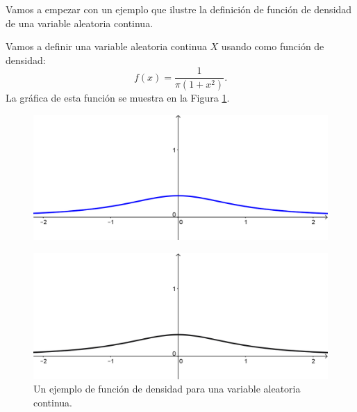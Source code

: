 Vamos a empezar con un ejemplo que ilustre la definición de función de densidad de una variable aleatoria continua.
\begin{ejemplo}
\label{cap05:ejem:CalculoProbabilidadIntegralParte1}
    Vamos a definir una variable aleatoria continua $X$ usando como función de densidad:
    \[f(x)=\dfrac{1}{\pi(1+x^2)}.\]
    La gráfica de esta función se muestra en la Figura \ref{cap05:fig:DistribucionCauchy}.
\begin{figure}[hp]
\begin{center}
\begin{enColor}
\includegraphics[width=12cm]{../fig/Cap05-DistribucionCauchy.png}\\
\end{enColor}
\begin{bn}
\includegraphics[width=12cm]{../fig/Cap05-DistribucionCauchy-bn.png}
\end{bn}
\caption{Un ejemplo de función de densidad para una variable aleatoria continua.}
\label{cap05:fig:DistribucionCauchy}
\end{center}
\end{figure}


\end{ejemplo}
